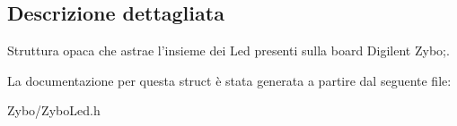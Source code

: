\subsection{Descrizione dettagliata}
Struttura opaca che astrae l'insieme dei Led presenti sulla board Digilent Zybo;. 

La documentazione per questa struct è stata generata a partire dal seguente file\+:\begin{DoxyCompactItemize}
\item 
Zybo/Zybo\+Led.\+h\end{DoxyCompactItemize}

